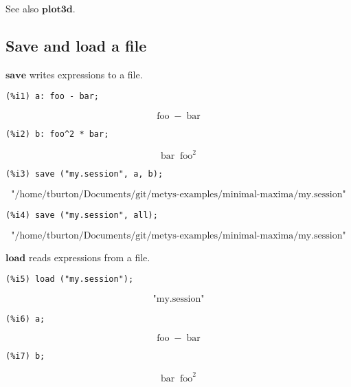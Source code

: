 \documentclass[12pt,leqno]{article}
\begin{document}
See also $\mathbf{plot3d}$.

\subsection{Save and load a file}

$\mathbf{save}$ writes expressions to a file.
\begin{verbatim}
(%i1) a: foo - bar;
\end{verbatim}
\begin{dmath}[number={\(\mathop{\mathrm{\%o}_{1}}\)}]
\mathop{\mathrm{foo}}-\mathop{\mathrm{bar}}
\end{dmath}
\begin{verbatim}
(%i2) b: foo^2 * bar;
\end{verbatim}
\begin{dmath}[number={\(\mathop{\mathrm{\%o}_{2}}\)}]
\mathop{\mathrm{bar}} {\mathop{\mathrm{foo}}}^{2}
\end{dmath}
\begin{verbatim}
(%i3) save ("my.session", a, b);
\end{verbatim}
\begin{dmath}[number={\(\mathop{\mathrm{\%o}_{3}}\)}]
\text{"/home/tburton/Documents/git/metys-examples/minimal-maxima/my.session"}
\end{dmath}
\begin{verbatim}
(%i4) save ("my.session", all);
\end{verbatim}
\begin{dmath}[number={\(\mathop{\mathrm{\%o}_{4}}\)}]
\text{"/home/tburton/Documents/git/metys-examples/minimal-maxima/my.session"}
\end{dmath}


$\mathbf{load}$ reads expressions from a file.
\begin{verbatim}
(%i5) load ("my.session");
\end{verbatim}
\begin{dmath}[number={\(\mathop{\mathrm{\%o}_{4}}\)}]
\text{"my.session"}
\end{dmath}
\begin{verbatim}
(%i6) a;
\end{verbatim}
\begin{dmath}[number={\(\mathop{\mathrm{\%o}_{5}}\)}]
\mathop{\mathrm{foo}}-\mathop{\mathrm{bar}}
\end{dmath}
\begin{verbatim}
(%i7) b;
\end{verbatim}
\begin{dmath}[number={\(\mathop{\mathrm{\%o}_{6}}\)}]
\mathop{\mathrm{bar}} {\mathop{\mathrm{foo}}}^{2}
\end{dmath}
\end{document}
